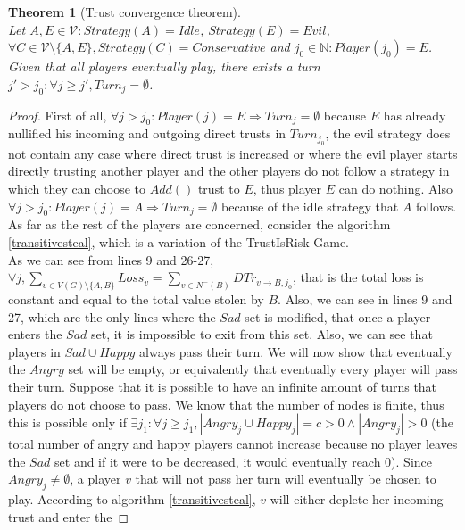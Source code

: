 \documentclass[11pt]{article}
\newtheorem{theorem}{Theorem}[section]
\theoremstyle{definition}
\theoremstyle{corollary}
\theoremstyle{lemma}
\begin{document}
    \begin{theorem}[Trust convergence theorem] \ \\
    \label{convergence}
       Let $A,E \in \mathcal{V} : Strategy(A) = Idle$, $Strategy(E) = Evil$, $\forall C \in \mathcal{V} \setminus \{A,E\},
       Strategy(C) = Conservative$ and $j_0 \in \mathbb{N} : Player(j_0) = E$. Given that all players eventually play, there
       exists a turn $j' > j_0 : \forall j \geq j', Turn_j = \emptyset$.
    \end{theorem}
    \begin{proof}
       First of all, $\forall j > j_0 : Player(j) = E \Rightarrow Turn_j = \emptyset$ because $E$ has already nullified his
       incoming and outgoing direct trusts in $Turn_{j_0}$, the evil strategy does not contain any case where direct trust is
       increased or where the evil player starts directly trusting another player and the other players do not follow a
       strategy in which they can choose to $Add()$ trust to $E$, thus player $E$ can do nothing. Also $\forall j > j_0 :
       Player(j) = A \Rightarrow Turn_j = \emptyset$ because of the idle strategy that $A$ follows. As far as the
       rest of the players are concerned, consider the algorithm \ref{transitivesteal}, which is a variation of the
       TrustIsRisk Game. \\
       As we can see from lines 9 and 26-27, $\forall j, \sum\limits_{v \in V(G) \setminus \{A,B\}}Loss_v =
       \sum\limits_{v \in N^{-}(B)}DTr_{v \rightarrow B, j_0}$, that is the total loss is constant and equal to the total
       value stolen by $B$. Also, we can see in lines 9 and 27, which are the only lines where the $Sad$ set is modified,
       that once a player enters the $Sad$ set, it is impossible to exit from this set. Also, we can see that players in
       $Sad \cup Happy$ always pass their turn. We will now show that eventually the $Angry$ set will be empty, or
       equivalently that eventually every player will pass their turn. Suppose that it is possible to have an infinite amount
       of turns that players do not choose to pass. We know that the number of nodes is finite, thus this is possible only if
       $\exists j_1: \forall j \geq j_1, |Angry_j \cup Happy_j| = c > 0 \wedge |Angry_j| > 0$ (the total number of angry and
       happy players cannot increase because no player leaves the $Sad$ set and if it were to be decreased, it would
       eventually reach 0). Since $Angry_j \neq \emptyset$, a player $v$ that will not pass her turn will eventually be
       chosen to play. According to algorithm \ref{transitivesteal}, $v$ will either deplete her incoming trust and enter the

\end{proof}
\end{document}
